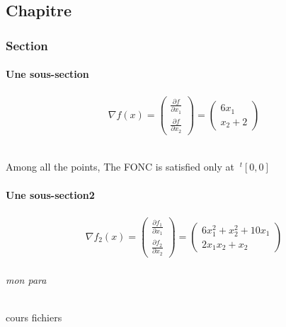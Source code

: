 \documentclass{report}
\begin{document}
\part{}
\chapter{Chapitre}
\section{Section}
\subsection{Une sous-section}
\begin{align*}
    \nabla f(x)= \begin{pmatrix}
   \frac{\partial f}{\partial x_1}  \\
    \frac{\partial f}{\partial x_2} 
    \end{pmatrix} = \begin{pmatrix}
    6x_1 \\
    x_2 + 2
    \end{pmatrix}
\end{align*}
\paragraph{}
Among all the points, The FONC is satisfied only at $~^t[0,0]$
\subsection{Une sous-section2}

\begin{align*}

    
    \nabla f_2(x)= \begin{pmatrix}
   \frac{\partial f_1}{\partial x_1}  \\
    \frac{\partial f_2}{\partial x_2} 
    \end{pmatrix} = \begin{pmatrix}
    6x_1^2 + x_2^2 + 10x_1 \\
    2x_1x_2 + x_2
    \end{pmatrix}
\end{align*}

\paragraph{mon para}
cours fichiers
\end{document}
